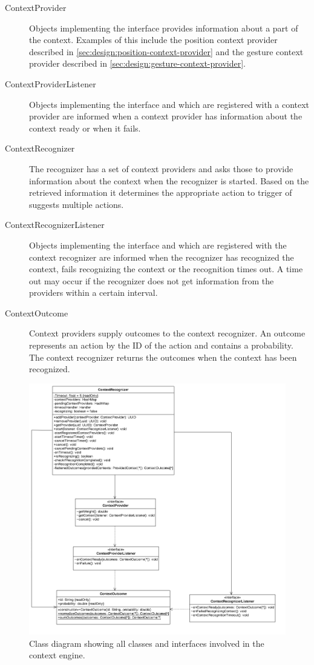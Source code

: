 \begin{description}
\item[ContextProvider] Objects implementing the interface provides information about a part of the context. Examples of this include the position context provider described in \cref{sec:design:position-context-provider} and the gesture context provider described in \cref{sec:design:gesture-context-provider}.
\item[ContextProviderListener] Objects implementing the interface and which are registered with a context provider are informed when a context provider has information about the context ready or when it fails.
\item[ContextRecognizer] The recognizer has a set of context providers and asks those to provide information about the context when the recognizer is started. Based on the retrieved information it determines the appropriate action to trigger of suggests multiple actions.
\item[ContextRecognizerListener] Objects implementing the interface and which are registered with the context recognizer are informed when the recognizer has recognized the context, fails recognizing the context or the recognition times out. A time out may occur if the recognizer does not get information from the providers within a certain interval.
\item[ContextOutcome] Context providers supply outcomes to the context recognizer. An outcome represents an action by the ID of the action and contains a probability. The context recognizer returns the outcomes when the context has been recognized.
\end{description}

\begin{figure}[h!]
\centering
\includegraphics[width=\textwidth]{images/uml-context-engine}
\caption{Class diagram showing all classes and interfaces involved in the context engine.}
\label{fig:design:context-engine:class-diagram}
\end{figure}

